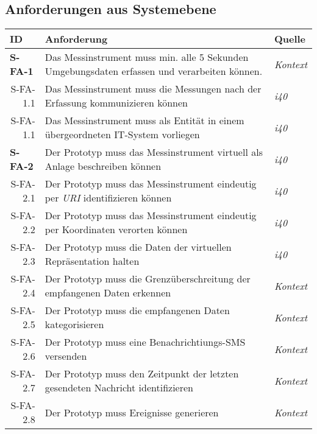 \newpage
\subsection{Anforderungen aus Systemebene}

  \begin{tabularx}{\textwidth}{@{}lXp{2cm}@{}}
      \toprule
      ID                & Anforderung & Quelle \\
      \midrule
      \endhead
      \textbf{S-FA-1}              &  Das Messinstrument muss min. alle 5 Sekunden Umgebungsdaten erfassen und verarbeiten können.   &  \textit{Kontext}     \\
      \multicolumn{1}{r}{S-FA-1.1} &   Das Messinstrument muss die Messungen nach der Erfassung kommunizieren können & \textit{\ac{i40}}\\
      \multicolumn{1}{r}{S-FA-1.1} &   Das Messinstrument muss als Entität in einem übergeordneten IT-System vorliegen & \textit{\ac{i40}}\\
      \textbf{S-FA-2}              &   Der Prototyp muss das Messinstrument virtuell als Anlage beschreiben können & \textit{\ac{i40}}        \\
      \multicolumn{1}{r}{S-FA-2.1} &   Der Prototyp muss das Messinstrument eindeutig per \textit{URI} identifizieren können  & \textit{\ac{i40}}\\
      \multicolumn{1}{r}{S-FA-2.2} &   Der Prototyp muss das Messinstrument eindeutig per Koordinaten verorten können  & \textit{\ac{i40}}\\
      \multicolumn{1}{r}{S-FA-2.3} & Der Prototyp muss die Daten der virtuellen Repräsentation halten  & \textit{\ac{i40}} \\
      \multicolumn{1}{r}{S-FA-2.4} & Der Prototyp muss die Grenzüberschreitung der empfangenen Daten erkennen &  \textit{Kontext}\\
      \multicolumn{1}{r}{S-FA-2.5} & Der Prototyp muss die empfangenen Daten kategorisieren &  \textit{Kontext}\\
      \multicolumn{1}{r}{S-FA-2.6} & Der Prototyp muss eine Benachrichtiungs-SMS versenden  &  \textit{Kontext}\\
      \multicolumn{1}{r}{S-FA-2.7} & Der Prototyp muss den Zeitpunkt der letzten gesendeten Nachricht identifizieren  &  \textit{Kontext} \\
      \multicolumn{1}{r}{S-FA-2.8} & Der Prototyp muss Ereignisse generieren  &  \textit{Kontext}\\

\end{tabularx}
